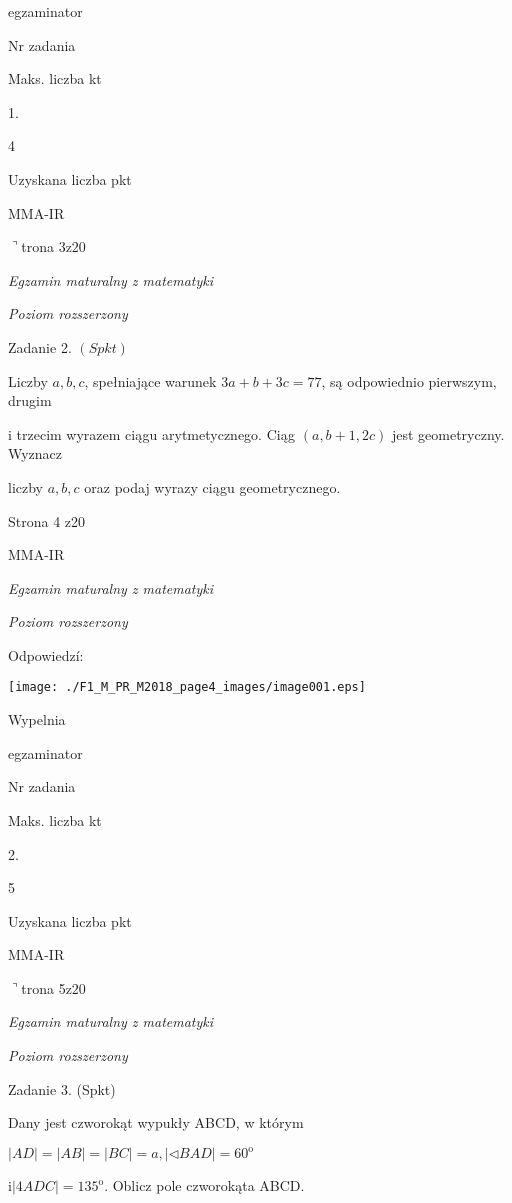 \documentclass[a4paper,12pt]{article}
\begin{document}
egzaminator

Nr zadania

Maks. liczba kt

1.

4

Uzyskana liczba pkt

MMA-IR

$\urcorner$trona 3$\mathrm{z}20$





{\it Egzamin maturalny z matematyki}

{\it Poziom rozszerzony}

Zadanie 2. $(Spkt)$

Liczby $a, b, c$, spełniające warunek $3a+b+3c=77$, są odpowiednio pierwszym, drugim

i trzecim wyrazem ciągu arytmetycznego. Ciąg $(a,b+1,2c)$ jest geometryczny. Wyznacz

liczby $a, b, c$ oraz podaj wyrazy ciągu geometrycznego.

Strona 4 z20

MMA-IR





{\it Egzamin maturalny z matematyki}

{\it Poziom rozszerzony}

Odpowiedzí:
\begin{center}
\texttt{[image: ./F1\_M\_PR\_M2018\_page4\_images/image001.eps]}
\end{center}
Wypelnia

egzaminator

Nr zadania

Maks. liczba kt

2.

5

Uzyskana liczba pkt

MMA-IR

$\urcorner$trona 5$\mathrm{z}20$





{\it Egzamin maturalny z matematyki}

{\it Poziom rozszerzony}

Zadanie 3. (Spkt)

Dany jest czworokąt wypukły ABCD, w którym

$|AD|=|AB|=|BC|=a, |\triangleleft BAD|=60^{\mathrm{o}}$

$\mathrm{i}|4ADC|=135^{\mathrm{o}}$. Oblicz pole czworokąta ABCD.
\end{document}
